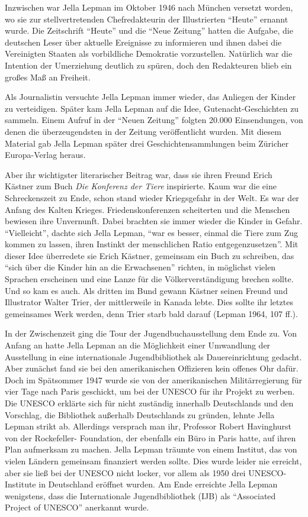 \documentclass[a4paper,
fontsize=11pt,
oneside,
numbers=noperiodatend,
parskip=half-,
bibliography=totoc,
final
]{scrartcl}
\begin{document}
Inzwischen war Jella Lepman im Oktober 1946 nach München versetzt
worden, wo sie zur stellvertretenden Chefredakteurin der Illustrierten
\enquote{Heute} ernannt wurde. Die Zeitschrift \enquote{Heute} und die
\enquote{Neue Zeitung} hatten die Aufgabe, die deutschen Leser über
aktuelle Ereignisse zu informieren und ihnen dabei die Vereinigten
Staaten als vorbildliche Demokratie vorzustellen. Natürlich war die
Intention der Umerziehung deutlich zu spüren, doch den Redakteuren blieb
ein großes Maß an Freiheit.~

Als Journalistin versuchte Jella Lepman immer wieder, das Anliegen der
Kinder zu verteidigen. Später kam Jella Lepman auf die Idee,
Gutenacht-Geschichten zu sammeln. Einem Aufruf in der \enquote{Neuen
Zeitung} folgten 20.000 Einsendungen, von denen die überzeugendsten in
der Zeitung veröffentlicht wurden. Mit diesem Material gab Jella Lepman
später drei Geschichtensammlungen beim Züricher Europa-Verlag heraus.~

Aber ihr wichtigster literarischer Beitrag war, dass sie ihren Freund
Erich Kästner zum Buch \emph{Die Konferenz der Tiere} inspirierte. Kaum
war die eine Schreckenszeit zu Ende, schon stand wieder Kriegsgefahr in
der Welt. Es war der Anfang des Kalten Krieges. Friedenskonferenzen
scheiterten und die Menschen bewiesen ihre Unvernunft. Dabei brachten
sie immer wieder die Kinder in Gefahr. \enquote{Vielleicht}, dachte sich
Jella Lepman, \enquote{war es besser, einmal die Tiere zum Zug kommen zu
lassen, ihren Instinkt der menschlichen Ratio entgegenzusetzen}. Mit
dieser Idee überredete sie Erich Kästner, gemeinsam ein Buch zu
schreiben, das \enquote{sich über die Kinder hin an die Erwachsenen}
richten, in möglichst vielen Sprachen erscheinen und eine Lanze für die
Völkerverständigung brechen sollte. Und so kam es auch. Als dritten im
Bund gewann Kästner seinen Freund und Illustrator Walter Trier, der
mittlerweile in Kanada lebte. Dies sollte ihr letztes gemeinsames Werk
werden, denn Trier starb bald darauf (Lepman 1964, 107 ff.).

In der Zwischenzeit ging die Tour der Jugendbuchausstellung dem Ende zu.
Von Anfang an hatte Jella Lepman an die Möglichkeit einer Umwandlung der
Ausstellung in eine internationale Jugendbibliothek als Dauereinrichtung
gedacht. Aber zunächst fand sie bei den amerikanischen Offizieren kein
offenes Ohr dafür. Doch im Spätsommer 1947 wurde sie von der
amerikanischen Militärregierung für vier Tage nach Paris geschickt, um
bei der UNESCO für ihr Projekt zu werben. Die UNESCO erklärte sich für
nicht zuständig innerhalb Deutschlands und den Vorschlag, die Bibliothek
außerhalb Deutschlands zu gründen, lehnte Jella Lepman strikt ab.
Allerdings versprach man ihr, Professor Robert Havinghurst von der
Rockefeller- Foundation, der ebenfalls ein Büro in Paris hatte, auf
ihren Plan aufmerksam zu machen. Jella Lepman träumte von einem
Institut, das von vielen Ländern gemeinsam finanziert werden sollte.
Dies wurde leider nie erreicht, aber sie ließ bei der UNESCO nicht
locker, vor allem als 1950 drei UNESCO-Institute in Deutschland eröffnet
wurden. Am Ende erreichte Jella Lepman wenigstens, dass die
Internationale Jugendbibliothek (IJB) als \enquote{Associated Project of
UNESCO} anerkannt wurde.
\end{document}
